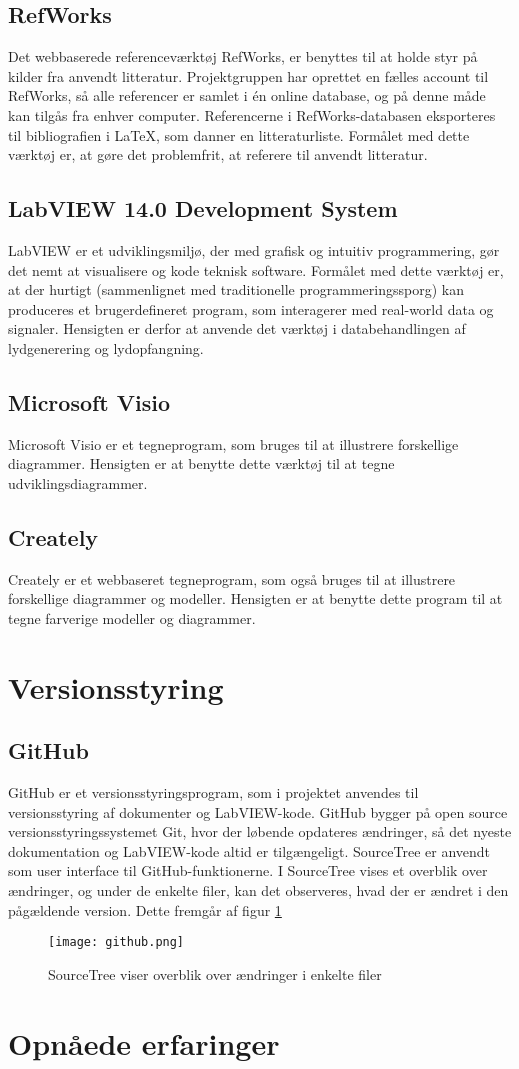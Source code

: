 	\subsection{RefWorks}
Det webbaserede referenceværktøj RefWorks, er benyttes til at holde styr på kilder fra anvendt litteratur. Projektgruppen har oprettet en fælles account til RefWorks, så alle referencer er samlet i én online database, og på denne måde kan tilgås fra enhver computer. Referencerne i RefWorks-databasen eksporteres til bibliografien i LaTeX, som danner en litteraturliste. Formålet med dette værktøj er, at gøre det problemfrit, at referere til anvendt litteratur. 

	\subsection{LabVIEW 14.0 Development System}
	LabVIEW er et udviklingsmiljø, der med grafisk og intuitiv programmering, gør det nemt at visualisere og kode teknisk software. Formålet med dette værktøj er, at der hurtigt (sammenlignet med traditionelle programmeringssporg) kan produceres et brugerdefineret program, som interagerer med real-world data og signaler. Hensigten er derfor at anvende det værktøj i databehandlingen af lydgenerering og lydopfangning. 
	
	\subsection{Microsoft Visio}   
	Microsoft Visio er et tegneprogram, som bruges til at illustrere forskellige diagrammer. Hensigten er at benytte dette værktøj til at tegne udviklingsdiagrammer.
	
	\subsection{Creately}
	Creately er et webbaseret tegneprogram, som også bruges til at illustrere forskellige diagrammer og modeller. Hensigten er at benytte dette program til at tegne farverige modeller og diagrammer. 
	
\section{Versionsstyring}
\subsection{GitHub}
GitHub er et versionsstyringsprogram, som i projektet anvendes til versionsstyring af dokumenter og LabVIEW-kode. GitHub
bygger på open source versionsstyringssystemet Git, hvor der løbende opdateres ændringer, så det nyeste dokumentation og LabVIEW-kode altid er tilgængeligt. SourceTree er anvendt som user interface til GitHub-funktionerne. I SourceTree vises et overblik over ændringer, og under de enkelte filer, kan det observeres, hvad der er ændret i den pågældende version. Dette fremgår af figur \ref{fig:git}

\begin{figure}[htb]
\centering
\texttt{[image: github.png]}
\caption{SourceTree viser overblik over ændringer i enkelte filer}
\label{fig:git}	
\end{figure}
 
\section{Opnåede erfaringer}
 